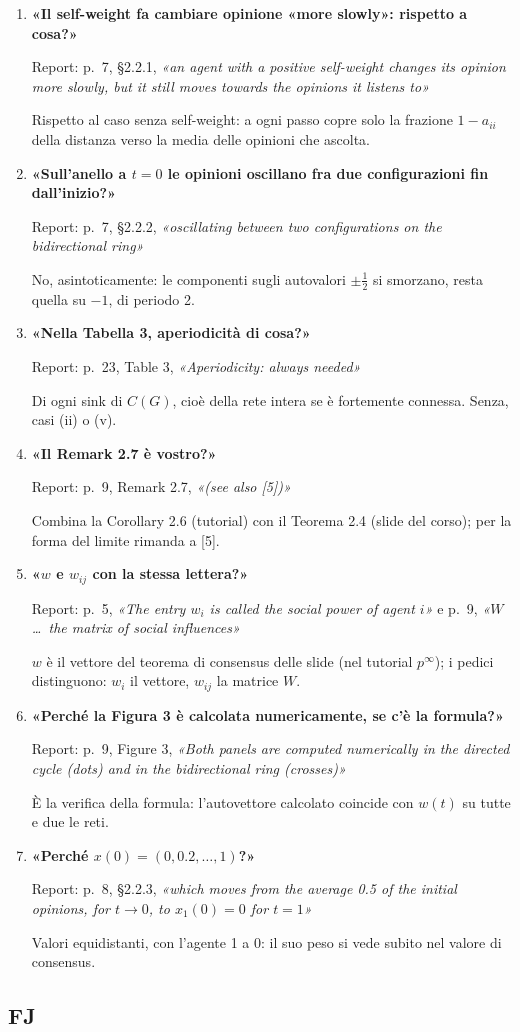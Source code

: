 \documentclass[a4paper,10pt]{article}
\newcommand{\D}[3]{\item \textbf{«#1»}\par{\small\color{gray}Report: #2}\par #3}
\newcommand{\R}[2]{#1, \textit{«#2»}}
\newcommand{\priorita}[1]{\par\smallskip{\color{unipd}\itshape #1}\par}
\begin{document}
\priorita{Priorità bassa}
\begin{enumerate}[resume*=fdg]
  \D{Il self-weight fa cambiare opinione «more slowly»: rispetto a cosa?}
  {\R{p.~7, §2.2.1}{an agent with a positive self-weight changes its opinion more slowly, but it still moves towards the opinions it listens to}}
  {Rispetto al caso senza self-weight: a ogni passo copre solo la frazione $1-a_{ii}$ della distanza verso la media delle opinioni che ascolta.}
  \D{Sull'anello a $t=0$ le opinioni oscillano fra due configurazioni fin dall'inizio?}
  {\R{p.~7, §2.2.2}{oscillating between two configurations on the bidirectional ring}}
  {No, asintoticamente: le componenti sugli autovalori $\pm\frac12$ si smorzano, resta quella su $-1$, di periodo 2.}
  \D{Nella Tabella 3, aperiodicità di cosa?}
  {\R{p.~23, Table 3}{Aperiodicity: always needed}}
  {Di ogni sink di $C(G)$, cioè della rete intera se è fortemente connessa. Senza, casi (ii) o (v).}
  \D{Il Remark 2.7 è vostro?}
  {\R{p.~9, Remark 2.7}{(see also [5])}}
  {Combina la Corollary 2.6 (tutorial) con il Teorema 2.4 (slide del corso); per la forma del limite rimanda a [5].}
  \D{$w$ e $w_{ij}$ con la stessa lettera?}
  {\R{p.~5}{The entry $w_i$ is called the social power of agent $i$} e \R{p.~9}{$W$ \dots\ the matrix of social influences}}
  {$w$ è il vettore del teorema di consensus delle slide (nel tutorial $p^\infty$); i pedici distinguono: $w_i$ il vettore, $w_{ij}$ la matrice $W$.}
  \D{Perché la Figura 3 è calcolata numericamente, se c'è la formula?}
  {\R{p.~9, Figure 3}{Both panels are computed numerically in the directed cycle (dots) and in the bidirectional ring (crosses)}}
  {È la verifica della formula: l'autovettore calcolato coincide con $w(t)$ su tutte e due le reti.}
  \D{Perché $x(0)=(0,0.2,\dots,1)$?}
  {\R{p.~8, §2.2.3}{which moves from the average 0.5 of the initial opinions, for $t \to 0$, to $x_1(0) = 0$ for $t = 1$}}
  {Valori equidistanti, con l'agente 1 a 0: il suo peso si vede subito nel valore di consensus.}
\end{enumerate}

\clearpage
\subsection*{FJ}
\end{document}

